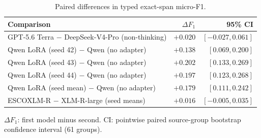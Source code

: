 \documentclass[fleqn,12pt]{wlpeerj}
\begin{document}
\setcounter{table}{6}
\begin{table}[!htbp]
\centering\small
\caption{Paired differences in typed exact-span micro-F1.}
\label{tab:core-paired}
\begin{tabularx}{\linewidth}{@{}Lrr@{}}
\toprule Comparison & $\Delta F_1$ & 95\% CI \\\midrule
GPT-5.6 Terra $-$ DeepSeek-V4-Pro (non-thinking) & ${+0.020}$ & $[-0.027, 0.061]$ \\
Qwen LoRA (seed 42) $-$ Qwen (no adapter) & ${+0.138}$ & $[0.069, 0.200]$ \\
Qwen LoRA (seed 43) $-$ Qwen (no adapter) & ${+0.202}$ & $[0.133, 0.269]$ \\
Qwen LoRA (seed 44) $-$ Qwen (no adapter) & ${+0.197}$ & $[0.123, 0.268]$ \\
Qwen LoRA (seed mean) $-$ Qwen (no adapter) & ${+0.179}$ & $[0.111, 0.242]$ \\
ESCOXLM-R $-$ XLM-R-large (seed means) & ${+0.016}$ & $[-0.005, 0.035]$ \\
\bottomrule
\end{tabularx}
\par\smallskip\RaggedRight\footnotesize $\Delta F_1$: first model minus second. CI: pointwise paired source-group bootstrap confidence interval (61 groups).
\end{table}

\end{document}
